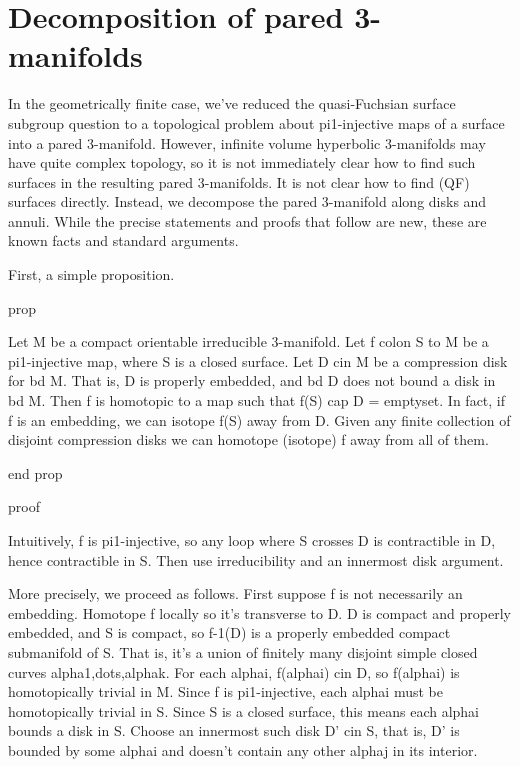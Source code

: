 \section{Decomposition of pared 3-manifolds}

In the geometrically finite case, we've reduced the quasi-Fuchsian surface
subgroup question to a topological problem about pi1-injective maps of
a surface into a pared 3-manifold. However, infinite volume hyperbolic
3-manifolds may have quite complex topology, so it is not immediately clear how
to find such surfaces in the resulting pared 3-manifolds. It is not clear how
to find (QF) surfaces directly. Instead, we decompose the pared 3-manifold
along disks and annuli. While the precise statements and proofs that follow are
new, these are known facts and standard arguments.



%

First, a simple proposition.

prop

Let M be a compact orientable irreducible 3-manifold. Let f colon S to M be
a pi1-injective map, where S is a closed surface.  Let D cin M be a compression
disk for bd M.  That is, D is properly embedded, and bd D does not bound a disk
in bd M.  Then f is homotopic to a map such that f(S) cap D = emptyset.  In
fact, if f is an embedding, we can isotope f(S) away from D.  Given any finite
collection of disjoint compression disks we can homotope (isotope) f away from
all of them.

end prop

proof

Intuitively, f is pi1-injective, so any loop where S crosses D is contractible
in D, hence contractible in S. Then use irreducibility and an innermost disk
argument.

More precisely, we proceed as follows. First suppose f is not necessarily an
embedding. Homotope f locally so it's transverse to D. D is compact and
properly embedded, and S is compact, so f-1(D) is a properly embedded compact
submanifold of S. That is, it's a union of finitely many disjoint simple closed
curves alpha1,dots,alphak. For each alphai, f(alphai) cin D, so f(alphai) is
homotopically trivial in M.  Since f is pi1-injective, each alphai must be
homotopically trivial in S. Since S is a closed surface, this means each alphai
bounds a disk in S. Choose an innermost such disk D' cin S, that is, D' is
bounded by some alphai and doesn't contain any other alphaj in its interior.

